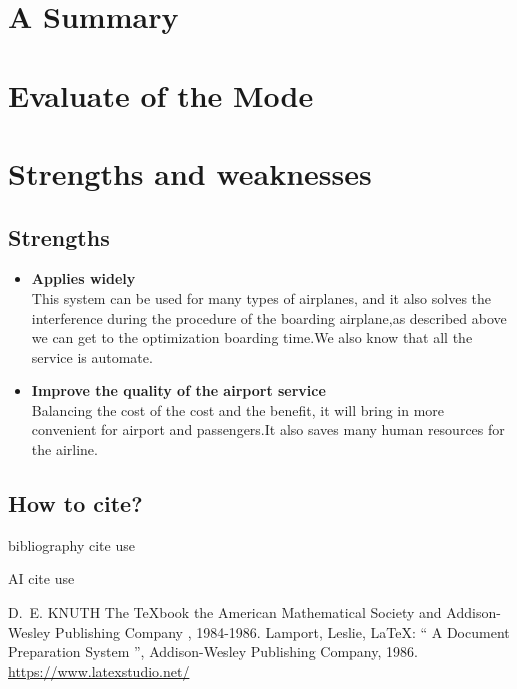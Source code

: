 \documentclass{mcmthesis}
\begin{document}
\section{A Summary}
\lipsum[6]

\section{Evaluate of the Mode}

\section{Strengths and weaknesses}
\lipsum[12]

\subsection{Strengths}
\begin{itemize}
\item \textbf{Applies widely}\\
This  system can be used for many types of airplanes, and it also
solves the interference during  the procedure of the boarding
airplane,as described above we can get to the  optimization
boarding time.We also know that all the service is automate.
\item \textbf{Improve the quality of the airport service}\\
Balancing the cost of the cost and the benefit, it will bring in
more convenient  for airport and passengers.It also saves many
human resources for the airline.
\end{itemize}

\subsection{How to cite?}
bibliography cite use \cite{1,2,3}

AI cite use 

\begin{thebibliography}{99}
 D.~E. KNUTH   The \TeX{}book  the American
Mathematical Society and Addison-Wesley
Publishing Company , 1984-1986.
Lamport, Leslie,  \LaTeX{}: `` A Document Preparation System '',
Addison-Wesley Publishing Company, 1986.
\url{https://www.latexstudio.net/}
\end{thebibliography}
\end{document}
